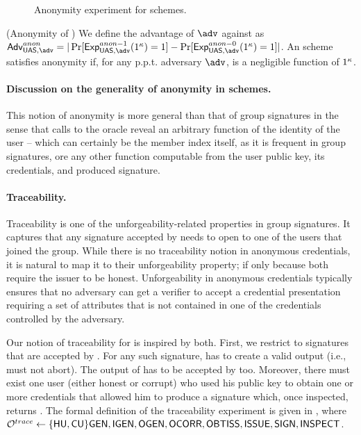 \begin{figure}[htp!]
  \caption{Anonymity experiment for \UAS schemes.}
  \label{fig:exp-uas-anonb}
\end{figure}

\begin{definition}{(Anonymity of \UAS)}
  We define the advantage \AdvAnon of $\adv$ against \ExpAnonb as
  $\AdvAnon=|\Pr\lbrack\ExpAnono(1^\secpar)=1\rbrack-
  \Pr\lbrack\ExpAnonz(1^\secpar)=1\rbrack|$.
  An \UAS scheme satisfies anonymity if, for any p.p.t. adversary $\adv$,
  \AdvAnon is a negligible function of $1^\kappa$.
\end{definition}

\paragraph{Discussion on the generality of anonymity in \UAS schemes.} %
This notion of anonymity is more general than that of group signatures in the
sense that calls to the \INSPECT oracle reveal an arbitrary function of the
identity of the user -- which can certainly be the member index itself, as it
is frequent in group signatures, ore any other function computable from the
user public key, its credentials, and produced signature. 

\paragraph{Traceability.} %
Traceability is one of the unforgeability-related properties in group
signatures. It captures that any signature accepted by \Verify needs to open
to one of the users that joined the group. While there is no traceability notion
in anonymous credentials, it is natural to map it to their unforgeability
property; if only because both require the issuer to be honest. Unforgeability
in anonymous credentials typically ensures that no adversary can get a verifier
to accept a credential presentation requiring a set of attributes that is not
contained in one of the credentials controlled by the adversary.

Our notion of traceability for \UAS is inspired by both. First, we restrict to
signatures that are accepted by \Verify. For any such signature, \Inspect has to
create a valid output (i.e., must not abort). The output of \Inspect has to be
accepted by \Judge too. Moreover, there must exist one user (either honest or
corrupt) who used his public key to obtain one or more credentials that allowed
him to produce a signature which, once inspected, returns \y. The formal
definition of the traceability experiment is given in ,
where $\mathcal{O}^{trace} \gets \lbrace\mathsf{HU},\mathsf{CU}\rbrace\mathsf{GEN},\mathsf{IGEN},\mathsf{OGEN},\mathsf{OCORR},\mathsf{OBTISS},
\mathsf{ISSUE},\mathsf{SIGN},\mathsf{INSPECT}$.

